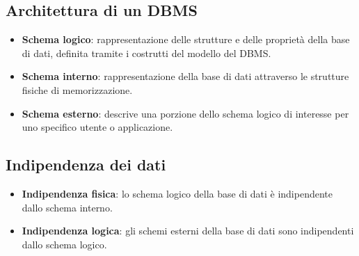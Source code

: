 \subsection{Architettura di un DBMS}

\begin{itemize}
    \item \textbf{Schema logico}: rappresentazione delle strutture e delle proprietà della base di dati, definita tramite i costrutti del modello del DBMS.
    \item \textbf{Schema interno}: rappresentazione della base di dati attraverso le strutture fisiche di memorizzazione.
    \item \textbf{Schema esterno}: descrive una porzione dello schema logico di interesse per uno specifico utente o applicazione.
\end{itemize}

\subsection{Indipendenza dei dati}

\begin{itemize}
    \item \textbf{Indipendenza fisica}: lo schema logico della base di dati è indipendente dallo schema interno.
    \item \textbf{Indipendenza logica}: gli schemi esterni della base di dati sono indipendenti dallo schema logico.
\end{itemize}
